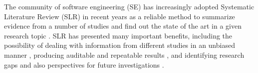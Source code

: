 \documentclass{article}
\begin{document}



The community of software engineering (SE) has increasingly adop\-ted Systematic Literature Review (SLR) in recent years \cite{Mendes2020} as a reliable method to summarize evidence from a number of studies and find out the state of the art in a given research topic \cite{Nakagawa17,Kitchenham15}.
SLR has presented many important benefits, including the possibility of dealing with information from different studies in an unbiased manner \cite{Kitchenham15,Niazi15}, producing auditable and repeatable results \cite{Kitchenham2011Repeatability,Budgen2018Reporting}, and identifying research gaps and also perspectives for future investigations \cite{Kitchenham15}.
\end{document}

